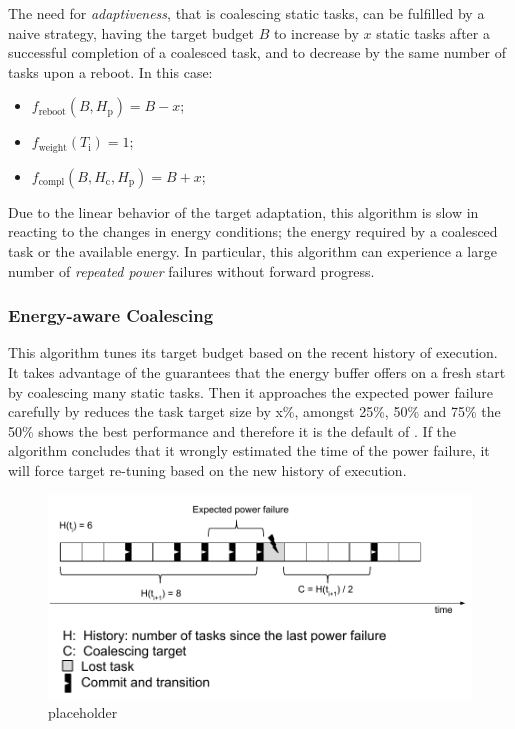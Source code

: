 The need for \emph{adaptiveness}, that is coalescing static tasks, can be fulfilled by a naive strategy, having the target budget $B$ to increase by $x$ static tasks after a successful completion of a coalesced task, and to decrease by the same number of tasks upon a reboot. In this case: 
\begin{itemize}
\item $f_\text{reboot}(B, H_\text{p}) = B - x $;
\item $f_\text{weight}(T_\text{i}) =  1$; 
\item $f_\text{compl}(B,H_\text{c},H_\text{p}) = B + x$; 
\end{itemize}
Due to the linear behavior of the target adaptation, this algorithm is slow in reacting to the changes in energy conditions; the energy required by a coalesced task or the available energy. In particular, this algorithm can experience a large number of \emph{repeated power} failures without forward progress. 

\subsubsection{Energy-aware Coalescing}
\label{subsec:ECoalescing}
This algorithm tunes its target budget based on the recent history of execution. It takes advantage of the guarantees that the energy buffer offers on a fresh start by coalescing many static tasks. Then it approaches the expected power failure carefully by reduces the task target size by x\%, amongst 25\%, 50\% and 75\% the 50\% shows the best performance and therefore it is the default of \sys. If the algorithm concludes that it wrongly estimated the time of the power failure, it will force target re-tuning based on the new history of execution. 


\begin{figure}
	\centering
	\includegraphics[width=0.5\columnwidth]{figures/energy_aware_algo}
	\caption{placeholder}
	\label{fig:energyAware}
\end{figure}
































